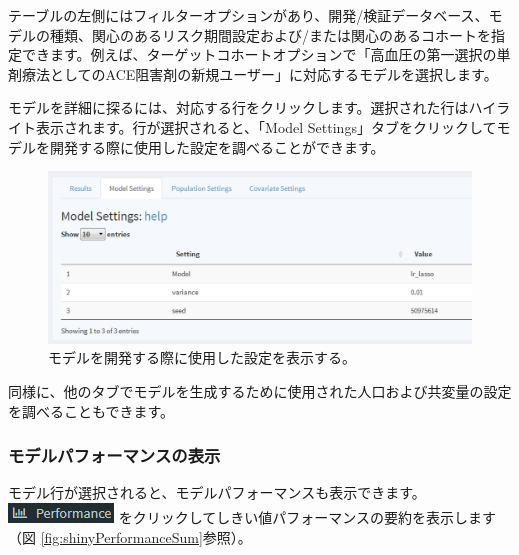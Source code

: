 \documentclass[
  11pt]{book}
\theoremstyle{definition}
\theoremstyle{definition}
\theoremstyle{definition}
\theoremstyle{definition}
\theoremstyle{remark}
\begin{document}
テーブルの左側にはフィルターオプションがあり、開発/検証データベース、モデルの種類、関心のあるリスク期間設定および/または関心のあるコホートを指定できます。例えば、ターゲットコホートオプションで「高血圧の第一選択の単剤療法としてのACE阻害剤の新規ユーザー」に対応するモデルを選択します。

モデルを詳細に探るには、対応する行をクリックします。選択された行はハイライト表示されます。行が選択されると、「Model Settings」タブをクリックしてモデルを開発する際に使用した設定を調べることができます。

\begin{figure}

{\centering \includegraphics[width=1\linewidth]{images/PatientLevelPrediction/shiny/shinyModel} 

}

\caption{モデルを開発する際に使用した設定を表示する。}\label{fig:shinyModel}
\end{figure}

同様に、他のタブでモデルを生成するために使用された人口および共変量の設定を調べることもできます。

\subsubsection*{モデルパフォーマンスの表示}\label{ux30e2ux30c7ux30ebux30d1ux30d5ux30a9ux30fcux30deux30f3ux30b9ux306eux8868ux793a}

モデル行が選択されると、モデルパフォーマンスも表示できます。\includegraphics{images/PatientLevelPrediction/performance.png} をクリックしてしきい値パフォーマンスの要約を表示します（図 \ref{fig:shinyPerformanceSum}参照）。
\end{document}
